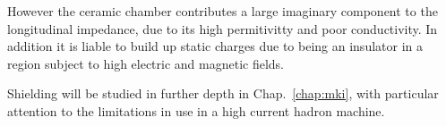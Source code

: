 However the ceramic chamber contributes a large imaginary component to the longitudinal impedance, due to its high permitivitty and poor conductivity. In addition it is liable to build up static charges due to being an insulator in a region subject to high electric and magnetic fields.

Shielding will be studied in further depth in Chap.~\ref{chap:mki}, with particular attention to the limitations in use in a high current hadron machine.
